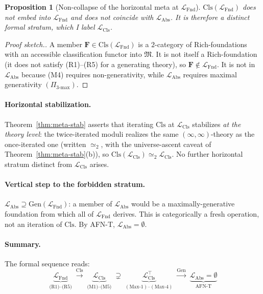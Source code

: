 \documentclass[11pt]{article}
\theoremstyle{plain}
\newtheorem{proposition}[theorem]{Proposition}
\theoremstyle{definition}
\newcommand{\fM}{\mathfrak{M}}
\newcommand{\LFnd}{\mathcal{L}_{\mathrm{Fnd}}}
\newcommand{\LCls}{\mathcal{L}_{\mathrm{Cls}}}
\newcommand{\LClsMax}{\mathcal{L}_{\mathrm{Cls}}^{\top}}
\newcommand{\LAbs}{\mathcal{L}_{\mathrm{Abs}}}
\begin{document}
\begin{proposition}[Non-collapse of the horizontal meta at $\LFnd$]\label{prop:no-collapse}
$\mathrm{Cls}(\LFnd)$ does \emph{not} embed into $\LFnd$ and does not coincide with $\LAbs$. It is therefore a distinct formal stratum, which I label $\LCls$.
\end{proposition}

\begin{proof}[Proof sketch.]
A member $\mathbf{F} \in \mathrm{Cls}(\LFnd)$ is a $2$-category of Rich-foundations with an accessible classification functor into $\fM$. It is not itself a Rich-foundation (it does not satisfy (R1)--(R5) for a generating theory), so $\mathbf{F} \notin \LFnd$. It is not in $\LAbs$ because (M4) requires non-generativity, while $\LAbs$ requires maximal generativity $(\Pi_{3\text{-max}})$.
\end{proof}

\paragraph{Horizontal stabilization.} Theorem~\ref{thm:meta-stab} asserts that iterating $\mathrm{Cls}$ at $\LCls$ stabilizes \emph{at the theory level}: the twice-iterated moduli realizes the same $(\infty, \infty)$-theory as the once-iterated one (written $\simeq_2$, with the universe-ascent caveat of Theorem~\ref{thm:meta-stab}(b)), so $\mathrm{Cls}(\LCls) \simeq_2 \LCls$. No further horizontal stratum distinct from $\LCls$ arises.

\paragraph{Vertical step to the forbidden stratum.} $\LAbs \supseteq \mathrm{Gen}(\LFnd)$: a member of $\LAbs$ would be a maximally-generative foundation from which all of $\LFnd$ derives. This is categorically a fresh operation, not an iteration of $\mathrm{Cls}$. By AFN-T, $\LAbs = \emptyset$.

\paragraph{Summary.} The formal sequence reads:
\[
\underbrace{\LFnd}_{\text{(R1)--(R5)}} \; \xrightarrow{\mathrm{Cls}} \; \underbrace{\LCls}_{\text{(M1)--(M5)}} \; \supsetneq \; \underbrace{\LClsMax}_{(\mathrm{Max}\text{-1})\text{--}(\mathrm{Max}\text{-4})} \; \xrightarrow{\mathrm{Gen}} \; \underbrace{\LAbs = \emptyset}_{\text{AFN-T}}
\]
\end{document}
